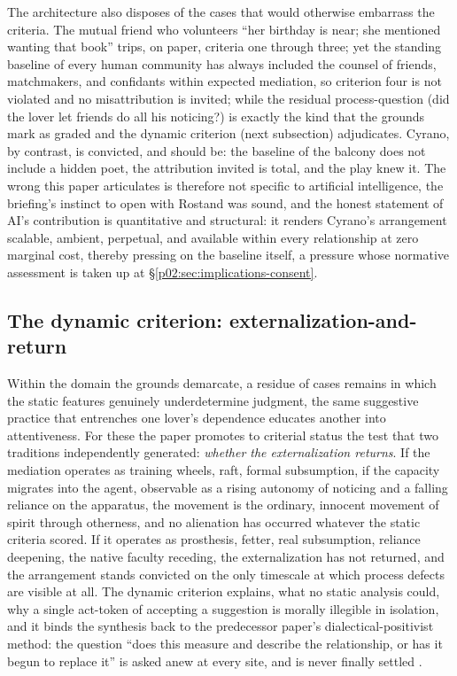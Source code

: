 The architecture also disposes of the cases that would otherwise embarrass the criteria. The mutual friend who volunteers ``her birthday is near; she mentioned wanting that book'' trips, on paper, criteria one through three; yet the standing baseline of every human community has always included the counsel of friends, matchmakers, and confidants within expected mediation, so criterion four is not violated and no misattribution is invited; while the residual process-question (did the lover let friends do all his noticing?) is exactly the kind that the grounds mark as graded and the dynamic criterion (next subsection) adjudicates. Cyrano, by contrast, is convicted, and should be: the baseline of the balcony does not include a hidden poet, the attribution invited is total, and the play knew it. The wrong this paper articulates is therefore not specific to artificial intelligence, the briefing's instinct to open with Rostand was sound, and the honest statement of AI's contribution is quantitative and structural: it renders Cyrano's arrangement scalable, ambient, perpetual, and available within every relationship at zero marginal cost, thereby pressing on the baseline itself, a pressure whose normative assessment is taken up at \S\ref{p02:sec:implications-consent}.

\subsection{The dynamic criterion: externalization-and-return}
\label{p02:sec:synthesis-dynamic}

Within the domain the grounds demarcate, a residue of cases remains in which the static features genuinely underdetermine judgment, the same suggestive practice that entrenches one lover's dependence educates another into attentiveness. For these the paper promotes to criterial status the test that two traditions independently generated: \emph{whether the externalization returns}. If the mediation operates as training wheels, raft, formal subsumption, if the capacity migrates into the agent, observable as a rising autonomy of noticing and a falling reliance on the apparatus, the movement is the ordinary, innocent movement of spirit through otherness, and no alienation has occurred whatever the static criteria scored. If it operates as prosthesis, fetter, real subsumption, reliance deepening, the native faculty receding, the externalization has not returned, and the arrangement stands convicted on the only timescale at which process defects are visible at all. The dynamic criterion explains, what no static analysis could, why a single act-token of accepting a suggestion is morally illegible in isolation, and it binds the synthesis back to the predecessor paper's dialectical-positivist method: the question ``does this measure and describe the relationship, or has it begun to replace it'' is asked anew at every site, and is never finally settled \parencite{huang2025toward}.

